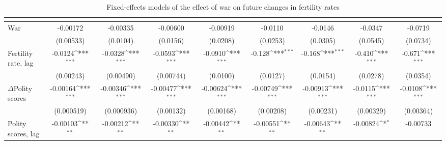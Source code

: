 \begin{table}[htbp]\centering
\def\sym#1{\ifmmode^{#1}\else\(^{#1}\)\fi}
\caption{Fixed-effects models of the effect of war on future changes in fertility rates\label{fefertility}}
\begin{tabular}{l*{8}{c}}
\hline\hline
                    &&&&&&&&\\
\hline
War            &    -0.00172         &    -0.00335         &    -0.00600         &    -0.00919         &     -0.0110         &     -0.0146         &     -0.0347         &     -0.0719         \\
                    &   (0.00533)         &    (0.0104)         &    (0.0156)         &    (0.0208)         &    (0.0253)         &    (0.0305)         &    (0.0545)         &    (0.0734)         \\
[1em]
Fertility rate, lag      &     -0.0124\sym{***}&     -0.0328\sym{***}&     -0.0593\sym{***}&     -0.0910\sym{***}&      -0.128\sym{***}&      -0.168\sym{***}&      -0.410\sym{***}&      -0.671\sym{***}\\
                    &   (0.00243)         &   (0.00490)         &   (0.00744)         &    (0.0100)         &    (0.0127)         &    (0.0154)         &    (0.0278)         &    (0.0354)         \\
[1em]
$\Delta$Polity scores             &    -0.00164\sym{***}&    -0.00346\sym{***}&    -0.00477\sym{***}&    -0.00624\sym{***}&    -0.00749\sym{***}&    -0.00913\sym{***}&     -0.0115\sym{***}&     -0.0108\sym{***}\\
                    &  (0.000519)         &  (0.000936)         &   (0.00132)         &   (0.00168)         &   (0.00208)         &   (0.00231)         &   (0.00329)         &   (0.00364)         \\
[1em]
Polity scores, lag        &    -0.00103\sym{**} &    -0.00212\sym{**} &    -0.00330\sym{**} &    -0.00442\sym{**} &    -0.00551\sym{**} &    -0.00643\sym{**} &    -0.00824\sym{*}  &    -0.00733         \\

\end{tabular}
\end{table}

